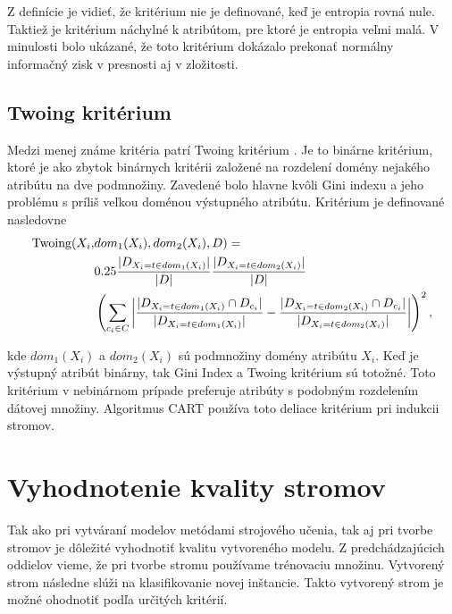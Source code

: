 Z definície je vidieť, že kritérium nie je definované, keď je entropia rovná nule. Taktiež je kritérium náchylné k atribútom, pre ktoré je entropia veľmi malá. V minulosti bolo ukázané, že toto kritérium dokázalo prekonať normálny informačný zisk v presnosti aj v zložitosti.

\subsection{Twoing kritérium}\label{kap1:2.5:2.5.5:Twoing} 
Medzi menej známe kritéria patrí Twoing kritérium \cite[s.88]{kap1-DataMiningForTrees}. Je to binárne kritérium, ktoré je ako zbytok binárnych kritérii založené na rozdelení domény nejakého atribútu na dve podmnožiny. Zavedené bolo hlavne kvôli Gini indexu a jeho problému s príliš veľkou doménou výstupného atribútu. Kritérium je definované nasledovne 
\begin{align}
\mbox{Twoing}(X_{i},& dom_{1}(X_{i}),dom_{2}(X_{i}),D) = \nonumber \\
& 0.25 
\dfrac{\lvert D_{X_{i} = t \in dom_{1}(X_{i})}\lvert}{\lvert D\lvert}
\dfrac{\lvert D_{X_{i} = t \in dom_{2}(X_{i})}\lvert}{\lvert D\lvert} \nonumber \\
& \left(
\sum_{c_{i} \in C}^{}
\left| 
\dfrac{
\lvert D_{X_{i} = t \in dom_{1}(X_{i})} \cap D_{c_{i}}\lvert }{\lvert D_{X_{i} = t \in dom_{1}(X_{i})}\lvert} -
\dfrac{
\lvert D_{X_{i} = t \in dom_{2}(X_{i})} \cap D_{c_{i}}\lvert }{\lvert D_{X_{i} = t \in dom_{2}(X_{i})}\lvert}
\right|
\right)^2, \label{kap1:2.5:2.5.5:TwoingDef} 
\end{align}

kde $dom_{1}(X_{i})$ a $dom_{2}(X_{i})$ sú podmnožiny domény atribútu $X_{i}$. Keď je výstupný atribút binárny, tak Gini Index a Twoing kritérium sú totožné. Toto kritérium v nebinárnom prípade preferuje atribúty s podobným rozdelením dátovej množiny. Algoritmus CART používa toto deliace kritérium pri indukcii stromov.


\section{Vyhodnotenie kvality stromov}\label{kap1:2.6:DTEvaluation}
Tak ako pri vytváraní modelov metódami strojového učenia, tak aj pri tvorbe stromov je dôležité vyhodnotiť kvalitu vytvoreného modelu. Z predchádzajúcich oddielov vieme, že pri tvorbe stromu používame trénovaciu množinu. Vytvorený strom následne slúži na klasifikovanie novej inštancie. Takto vytvorený strom je možné ohodnotiť podľa určitých kritérií.

